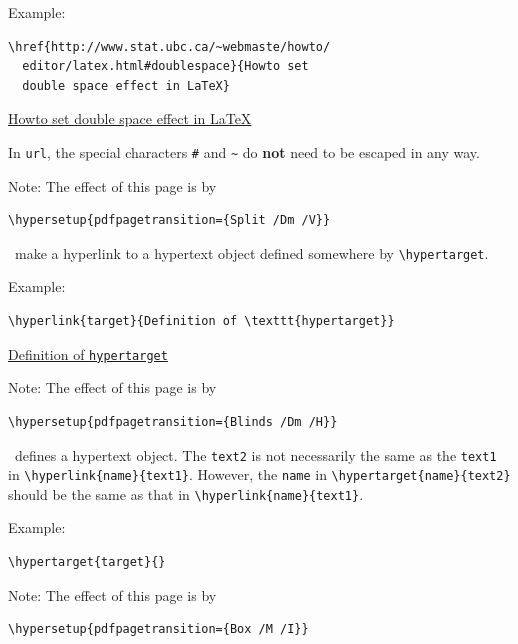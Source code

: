 \documentclass[landscape, headrule, footrule]{foils}
\begin{document}
Example: 
\begin{verbatim}
\href{http://www.stat.ubc.ca/~webmaste/howto/
  editor/latex.html#doublespace}{Howto set 
  double space effect in LaTeX}
\end{verbatim}
\href{http://www.stat.ubc.ca/~webmaste/howto/editor/latex.html#doublespace}
{Howto set double space effect in LaTeX}

In \texttt{url}, the special characters \verb+#+ and \verb+~+ do \textbf{not} need to be escaped
in any way.

Note: The effect of this page is by
\begin{verbatim}
\hypersetup{pdfpagetransition={Split /Dm /V}}
\end{verbatim}


\, make a hyperlink to a hypertext object defined
somewhere by \verb+\hypertarget+.

Example:
\begin{verbatim}
\hyperlink{target}{Definition of \texttt{hypertarget}}
\end{verbatim}
\hyperlink{target}{Definition of \texttt{hypertarget}}

Note: The effect of this page is by
\begin{verbatim}
\hypersetup{pdfpagetransition={Blinds /Dm /H}}
\end{verbatim}


\, defines a hypertext object. The \texttt{text2} is
not necessarily the same as the \texttt{text1} in \verb+\hyperlink{name}{text1}+. However, the
\texttt{name} in \verb+\hypertarget{name}{text2}+ should be the same as that in
\verb+\hyperlink{name}{text1}+.

Example:
\begin{verbatim}
\hypertarget{target}{}
\end{verbatim}
\hypertarget{target}{}

Note: The effect of this page is by
\begin{verbatim}
\hypersetup{pdfpagetransition={Box /M /I}}
\end{verbatim}

\end{document}
